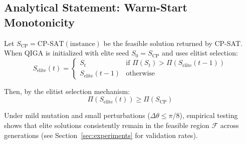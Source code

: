 \subsection*{Analytical Statement: Warm-Start Monotonicity}

\begin{empiricalproperty}
Let $S_{\text{CP}} = \text{CP-SAT}(\text{instance})$ be the feasible solution returned by CP-SAT. When QIGA is initialized with elite seed $S_0 = S_{\text{CP}}$ and uses elitist selection:
\begin{equation}
S_{\text{elite}}(t) = \begin{cases}
S_t & \text{if } \Pi(S_t) > \Pi(S_{\text{elite}}(t-1)) \\
S_{\text{elite}}(t-1) & \text{otherwise}
\end{cases}
\end{equation}

Then, by the elitist selection mechanism:
\begin{equation}
\Pi(S_{\text{elite}}(t)) \geq \Pi(S_{\text{CP}})
\end{equation}

Under mild mutation and small perturbations ($\Delta\theta \leq \pi/8$), empirical testing shows that elite solutions consistently remain in the feasible region $\mathcal{F}$ across generations (see Section~\ref{sec:experiments} for validation rates).
\end{empiricalproperty}

